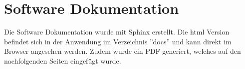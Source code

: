 \section{Software Dokumentation}
Die Software Dokumentation wurde mit Sphinx erstellt. Die \gls{html} Version befindet sich in der Anwendung im Verzeichnis ''docs'' und kann direkt im Browser angesehen werden. Zudem wurde ein PDF generiert, welches auf den nachfolgenden Seiten eingefügt wurde.

